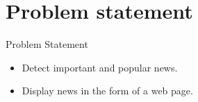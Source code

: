 \section{Problem statement}

\begin{frame}{Problem Statement}
	    \begin{itemize}
	        \item \Large {Detect important and popular news.}
	     \end{itemize}
	     \begin{itemize}
	        \item \Large {Display news in the form of a web page.}
	    \end{itemize}
\end{frame}
	